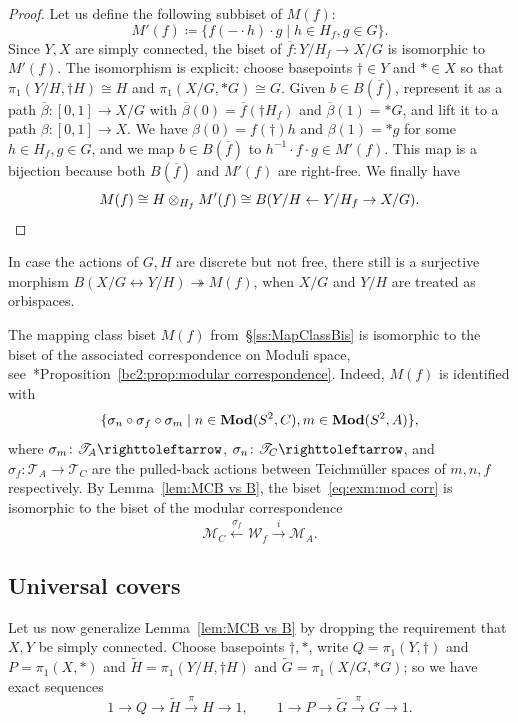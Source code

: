 \documentclass{amsart}
\newcommand\wtG{{\widetilde G}}
\newcommand\wtH{{\widetilde H}}
\begin{document}
\begin{proof}
  Let us define the following subbiset of $M(f)$:
  \begin{equation}\label{eq:M'}
    M'(f)\coloneqq\{f({-}\cdot h)\cdot g\mid h\in H_f,g\in G\}.
  \end{equation}
  Since $Y,X$ are simply connected, the biset of
  $\overline f\colon Y/H_f\to X/G$ is isomorphic to $M'(f)$. The
  isomorphism is explicit: choose basepoints $\dagger\in Y$ and
  $*\in X$ so that $\pi_1(Y/H,\dagger H)\cong H$ and
  $\pi_1(X/G,*G)\cong G$. Given $b\in B(\overline f)$, represent it as
  a path $\overline\beta\colon[0,1]\to X/G$ with
  $\overline\beta(0)=\overline f(\dagger H_f)$ and
  $\overline\beta(1)=*G$, and lift it to a path
  $\beta\colon[0,1]\to X$. We have $\beta(0)=f(\dagger)h$ and
  $\beta(1)=*g$ for some $h\in H_f,g\in G$, and we map
  $b\in B(\overline f)$ to $h^{-1}\cdot f\cdot g\in M'(f)$. This map
  is a bijection because both $B(\overline f)$ and $M'(f)$ are
  right-free. We finally have
  \[M(f)\cong H\otimes _{H_f} M'(f)\cong B(Y/H \leftarrow
    Y/H_f\rightarrow X/G).\qedhere\]
\end{proof}
In case the actions of $G,H$ are discrete but not free, there still is
a surjective morphism
$B(X/G\leftrightarrow Y/H)\twoheadrightarrow M(f)$, when $X/G$ and
$Y/H$ are treated as orbispaces.

\begin{exple}
  The mapping class biset $M(f)$ from~\S\ref{ss:MapClassBis} is
  isomorphic to the biset of the associated correspondence on Moduli
  space,
  see~\cite{bartholdi-dudko:bc2}*{Proposition~\ref{bc2:prop:modular
      correspondence}}. Indeed, $M(f)$ is identified with
  \begin{equation}\label{eq:exm:mod corr}
    \{\sigma_n \circ \sigma_f\circ \sigma_m\mid n\in\mathbf{\relax Mod}(S^2,C),m\in\mathbf{\relax Mod}(S^2,A) \},
  \end{equation}
  where $\sigma_m\colon \mathscr{T}_A \selfmap$,
  $\sigma_n\colon \mathscr{T}_C \selfmap$, and
  $\sigma_f\colon \mathscr{T}_A \to \mathscr{T}_C$ are the pulled-back
  actions between Teichm\"uller spaces of $m,n,f$ respectively. By
  Lemma~\ref{lem:MCB vs B}, the biset~\eqref{eq:exm:mod corr} is
  isomorphic to the biset of the modular correspondence
  \[\mathscr M_C
    \overset{\overline{\sigma_f}}\longleftarrow
    \mathscr W_f \overset i\longrightarrow  \mathscr M_A.\]        
\end{exple}

\subsection{Universal covers}
Let us now generalize Lemma~\ref{lem:MCB vs B} by dropping the
requirement that $X,Y$ be simply connected. Choose basepoints
$\dagger,*$, write $Q=\pi_1(Y,\dagger)$ and $P=\pi_1(X,*)$ and
$\wtH=\pi_1(Y/H,\dagger H)$ and $\wtG=\pi_1(X/G,*G)$;
so we have exact sequences
\begin{equation}\label{eq:gp-ses}
  1\to Q\to\wtH\overset\pi\to H\to 1,\qquad 1\to P\to\wtG\overset\pi\to G\to 1.
\end{equation}
\end{document}
